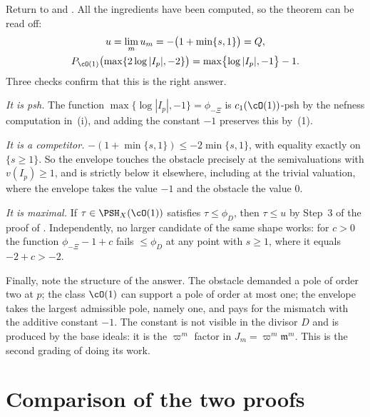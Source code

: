 \begin{example}
\label{ex:ch40-p2-envelope}
Return to  and .  All the
ingredients have been computed, so the theorem can be read off:
\[
 \begin{gathered}
 u=\lim_mu_m=-\bigl(1+\min\{s,1\}\bigr)=Q,\\
 P_{\cO(1)}\bigl(\max\{2\log|I_p|,-2\}\bigr)
 =\max\bigl\{\log|I_p|,-1\bigr\}-1 .
 \end{gathered}
\]
Three checks confirm that this is the right answer.

\emph{It is psh.}  The function $\max\{\log|I_p|,-1\}=\phi_{-\Xi}$ is
$c_1(\cO(1))$-psh by the nefness computation in
\,(i), and adding the constant $-1$ preserves
this by \,(1).

\emph{It is a competitor.}  $-(1+\min\{s,1\})\le-2\min\{s,1\}$, with
equality exactly on $\{s\ge1\}$.  So the envelope touches the obstacle
precisely at the semivaluations with $v(I_p)\ge1$, and is strictly below
it elsewhere, including at the trivial valuation, where the envelope takes
the value $-1$ and the obstacle the value $0$.

\emph{It is maximal.}  If $\tau\in\PSH_X(\cO(1))$ satisfies
$\tau\le\phi_D$, then $\tau\le u$ by Step~3 of the proof of
.  Independently, no larger candidate of the
same shape works: for $c>0$ the function $\phi_{-\Xi}-1+c$ fails
$\le\phi_D$ at any point with $s\ge1$, where it equals $-2+c>-2$.

Finally, note the structure of the answer.  The obstacle demanded a pole of
order two at $p$; the class $\cO(1)$ can support a pole of order at most
one; the envelope takes the largest admissible pole, namely one, and pays
for the mismatch with the additive constant $-1$.  The constant is not
visible in the divisor $D$ and is produced by the base ideals: it is the
$\varpi^m$ factor in $J_m=\varpi^m\mathfrak m^m$.  This is the second
grading of  doing its work.
\end{example}

\section{Comparison of the two proofs}
\label{sec:ch40-comparison}

